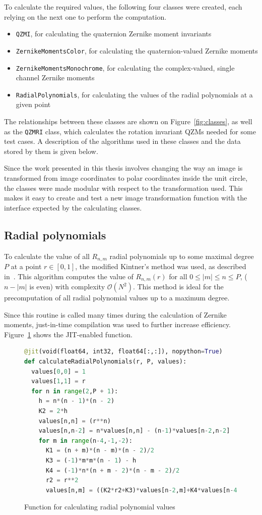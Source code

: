 To calculate the required values, the following four classes were created, each relying on the next one to perform the computation.
\begin{itemize}
    \item \texttt{QZMI}, for calculating the quaternion Zernike moment invariants
    \item \texttt{ZernikeMomentsColor}, for calculating the quaternion-valued Zernike moments
    \item \texttt{ZernikeMomentsMonochrome}, for calculating the complex-valued, single channel Zernike moments
    \item \texttt{RadialPolynomials}, for calculating the values of the radial polynomials at a given point
\end{itemize}
The relationships between these classes are shown on Figure~\ref{fig:classes}, as well as the \texttt{QZMRI} class, which calculates the rotation invariant QZMs needed for some test cases. A description of the algorithms used in these classes and the data stored by them is given below.

Since the work presented in this thesis involves changing the way an image is transformed from image coordinates to polar coordinates inside the unit circle, the classes were made modular with respect to the transformation used. This makes it easy to create and test a new image transformation function with the interface expected by the calculating classes.

\subsection{Radial polynomials}
To calculate the value of all $R_{n,m}$ radial polynomials up to some maximal degree $P$ at a point $r \in [0,1]$, the modified Kintner's method was used, as described in~\cite{kintner}. This algorithm computes the value of $R_{n,m}(r)$ for all $0 \leq |m| \leq n \leq P$, ($n - |m|$ is even) with complexity $\mathcal{O}(N^2)$. This method is ideal for the precomputation of all radial polynomial values up to a maximum degree.

Since this routine is called many times during the calculation of Zernike moments, just-in-time compilation was used to further increase efficiency. Figure~\ref{fig:radial_code} shows the JIT-enabled function.

\begin{figure}[tbp]
    \centering
    \begin{lstlisting}[language=Python]
@jit(void(float64, int32, float64[:,:]), nopython=True)
def calculateRadialPolynomials(r, P, values):
  values[0,0] = 1
  values[1,1] = r
  for n in range(2,P + 1):
    h = n*(n - 1)*(n - 2)
    K2 = 2*h
    values[n,n] = (r**n)
    values[n,n-2] = n*values[n,n] - (n-1)*values[n-2,n-2]
    for m in range(n-4,-1,-2):			
      K1 = (n + m)*(n - m)*(n - 2)/2
      K3 = (-1)*m*m*(n - 1) - h
      K4 = (-1)*n*(n + m - 2)*(n - m - 2)/2
      r2 = r**2
      values[n,m] = ((K2*r2+K3)*values[n-2,m]+K4*values[n-4,m])/K1\end{lstlisting}
    \caption{Function for calculating radial polynomial values}
    \label{fig:radial_code}
\end{figure}

